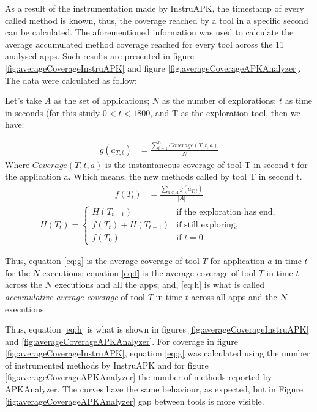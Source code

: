 As a result of the instrumentation made by InstruAPK, the timestamp of every called method is known, thus, the coverage reached by a tool in a specific second can be calculated. The aforementioned information was used to calculate the average accumulated method coverage reached for every tool across the 11 analysed apps. Such results are presented in figure \ref{fig:averageCoverageInstruAPK} and figure \ref{fig:averageCoverageAPKAnalyzer}. The data were calculated as follow:

Let's take $A$ as the set of applications; $N$ as the number of explorations; $t$ as time in seconds (for this study $0<t<1800$, and T as the exploration tool, then we have:

\begin{align}
  g(a_{T,t}) &= \frac{\sum_{i=1}^{n} Coverage(T,t,a)}{N}\label{eq:g} 
\end{align}
Where $Coverage(T,t,a)$ is the instantaneous coverage of tool T in second t for the application a. Which means, the new methods called by tool T in second t.
\begin{align}
f(T_t) &= \frac{\sum_{a \in A} g(a_{T,t})}{|A|} \label{eq:f}
\end{align}
\begin{align}
H(T_t)=\begin{cases}
		H(T_{t-1})& \text{if the exploration has end},\\ 
		f(T_t)+H(T_{t-1})& \text{if still exploring},\\
		f(T_0)& \text{if $t = 0$}.\label{eq:h}
	\end{cases}
\end{align}

Thus, equation \ref{eq:g} is the average coverage of tool $T$ for application $a$ in time $t$ for the $N$ executions; equation \ref{eq:f} is the average coverage of tool $T$ in time $t$ across the $N$ executions and all the apps; and, \ref{eq:h} is what is called \textit{accumulative average coverage} of tool $T$ in time $t$ across all apps and the $N$ executions. 


Thus, equation \ref{eq:h} is what is shown in figures \ref{fig:averageCoverageInstruAPK} and \ref{fig:averageCoverageAPKAnalyzer}. For coverage in figure \ref{fig:averageCoverageInstruAPK}, equation \ref{eq:g} was calculated using the number of instrumented methods by InstruAPK and for figure \ref{fig:averageCoverageAPKAnalyzer} the number of methods reported by APKAnalyzer. The curves have the same behaviour, as expected, but in Figure \ref{fig:averageCoverageAPKAnalyzer} gap between tools is more visible.

